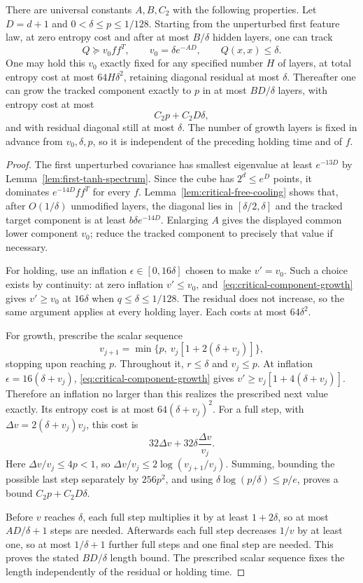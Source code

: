 \begin{lemma}
\label{lem:critical-cheap-holding}
There are universal constants $A,B,C_2$ with the following properties.
Let $D=d+1$ and $0<\delta\le p\le1/128$.
Starting from the unperturbed first feature law, at zero entropy cost
and after at most $B/\delta$ hidden layers, one can track
\[
 Q\succeq v_0ff^T,\qquad v_0=\delta e^{-AD},\qquad Q(x,x)\le\delta.
\]
One may hold this $v_0$ exactly fixed for any specified number $H$ of
layers, at total entropy cost at most $64H\delta^2$, retaining diagonal
residual at most $\delta$.
Thereafter one can grow the tracked component exactly to $p$ in at most
$BD/\delta$ layers, with entropy cost at most
\[
 C_2p+C_2D\delta,
\]
and with residual diagonal still at most $\delta$.
The number of growth layers is fixed in advance from $v_0,\delta,p$,
so it is independent of the preceding holding time and of $f$.
\end{lemma}

\begin{proof}
The first unperturbed covariance has smallest eigenvalue at least
$e^{-13D}$ by Lemma~\ref{lem:first-tanh-spectrum}. Since the cube has
$2^d\le e^D$ points, it dominates $e^{-14D}ff^T$ for every $f$.
Lemma~\ref{lem:critical-free-cooling} shows that, after $O(1/\delta)$
unmodified layers, the diagonal lies in $[\delta/2,\delta]$ and the
tracked target component is at least $b\delta e^{-14D}$.
Enlarging $A$ gives the displayed common
lower component $v_0$; reduce the tracked component to precisely that
value if necessary.

For holding, use an inflation $\epsilon\in[0,16\delta]$ chosen to
make $v'=v_0$. Such a choice exists by continuity: at zero inflation
$v'\le v_0$, and~\eqref{eq:critical-component-growth} gives $v'\ge v_0$
at $16\delta$ when $q\le\delta\le1/128$.
The residual does not increase, so the same argument applies at every
holding layer. Each costs at most $64\delta^2$.

For growth, prescribe the scalar sequence
\[
 v_{j+1}=\min\{p,\ v_j[1+2(\delta+v_j)]\},
\]
stopping upon reaching $p$. Throughout it, $r\le\delta$ and $v_j\le p$.
At inflation $\epsilon=16(\delta+v_j)$,
\eqref{eq:critical-component-growth} gives
$v'\ge v_j[1+4(\delta+v_j)]$.
Therefore an inflation no larger than this realizes the prescribed next
value exactly. Its entropy cost is at most $64(\delta+v_j)^2$.
For a full step, with $\Delta v=2(\delta+v_j)v_j$, this cost is
\[
 32\Delta v+32\delta\frac{\Delta v}{v_j}.
\]
Here $\Delta v/v_j\le4p<1$, so
$\Delta v/v_j\le2\log(v_{j+1}/v_j)$.
Summing, bounding the possible last step separately by $256p^2$, and
using $\delta\log(p/\delta)\le p/e$, proves a bound
$C_2p+C_2D\delta$.

Before $v$ reaches $\delta$, each full step multiplies it by at least
$1+2\delta$, so at most $AD/\delta+1$ steps are needed.
Afterwards each full step decreases $1/v$ by at least one, so at most
$1/\delta+1$ further full steps and one final step are needed.
This proves the stated $BD/\delta$ length bound. The prescribed scalar
sequence fixes the length independently of the residual or holding time.
\end{proof}

